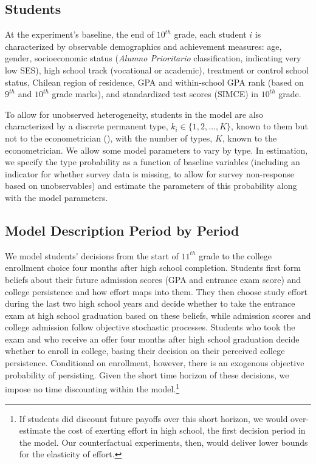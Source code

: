 \subsection{Students}\label{sec:students}
At the experiment's baseline, the end of $10^{th}$ grade, each student $i$ is characterized by observable demographics and achievement measures: age, gender, socioeconomic status ({\itshape Alumno Prioritario} classification, indicating very low SES), high school track (vocational or academic), treatment or control school status, Chilean region of residence, GPA and within-school GPA rank (based on $9^{th}$ and $10^{th}$ grade marks), and standardized test scores (SIMCE) in $10^{th}$ grade.\par 
To allow for unobserved heterogeneity, students in the model are also characterized by a discrete permanent type, $k_i\in\{1,2,...,K\}$, known to them but not to the econometrician (\citealp{heckman1984method,keane1994solution,keane1997career}), with the number of types, $K$, known to the econometrician. We allow some model parameters to vary by type. In estimation, we specify the type probability as a function of baseline variables (including an indicator for whether survey data is missing, to allow for survey non-response based on unobservables) and estimate the parameters of this probability along with the model parameters.\par 

\subsection{Model Description Period by Period}
We model students' decisions from the start of $11^{th}$ grade to the college enrollment choice four months after high school completion. Students first form beliefs about their future admission scores (GPA and entrance exam score) and college persistence and how effort maps into them. They then choose study effort during the last two high school years and decide whether to take the entrance exam at high school graduation based on these beliefs, while admission scores and college admission follow objective stochastic processes. Students who took the exam and who receive an offer four months after high school graduation decide whether to enroll in college, basing their decision on their perceived college persistence. Conditional on enrollment, however, there is an exogenous objective probability of persisting. Given the short time horizon of these decisions, we impose no time discounting within the model.\footnote{If students did discount future payoffs over this short horizon, we would over-estimate the cost of exerting effort in high school, the first decision period in the model. Our counterfactual experiments, then, would deliver lower bounds for the elasticity of effort.}

